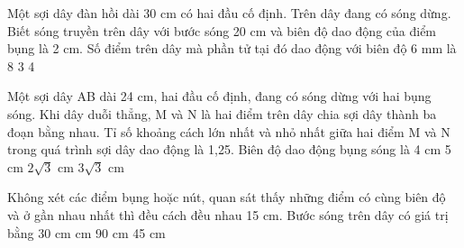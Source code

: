 \begin{vidu}%
Một sợi dây đàn hồi dài 30 cm có hai đầu cố định. Trên dây đang có sóng dừng. Biết sóng truyền trên dây với bước sóng 20 cm và biên độ dao động của điểm bụng là 2 cm. Số điểm trên dây mà phần tử tại đó dao động với biên độ 6 mm là
\choice
{8}
{}
{3}
{4}
\end{vidu} %

\begin{vidu}%
Một sợi dây AB dài 24 cm, hai đầu cố định, đang có sóng dừng với hai bụng sóng. Khi dây duỗi thẳng, M và N là hai điểm trên dây chia sợi dây thành ba đoạn bằng nhau. Tỉ số khoảng cách lớn nhất và nhỏ nhất giữa hai điểm M và N trong quá trình sợi dây dao động là 1,25. Biên độ dao động bụng sóng là
\choice
{4 cm}
{5 cm}
{\True $2\sqrt{3}$ cm}
{$3\sqrt{3}$ cm}
\end{vidu} %
\begin{vidu}%
Không xét các điểm bụng hoặc nút, quan sát thấy những điểm có cùng biên độ và ở gần nhau nhất thì đều cách đều nhau 15 cm. Bước sóng trên dây có giá trị bằng
\choice
{30 cm}
{ cm}
{90 cm}
{45 cm}
\end{vidu} %
